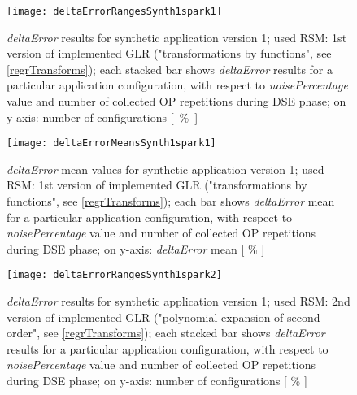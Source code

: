 \begin{figure}[H]

    \centering
    
    \texttt{[image: deltaErrorRangesSynth1spark1]}
    
     \caption{\textit{deltaError} results for synthetic application version 1; used RSM: 1st version of implemented GLR ("transformations by functions", see \ref{regrTransforms}); each stacked bar shows \textit{deltaError} results for a particular application configuration, with respect to \textit{noisePercentage} value and number of collected OP repetitions during DSE phase; on y-axis: number of configurations \hbox{[ \% ]}}
    
    \label{fig::synth1spark1::intervals}
    
\end{figure}

\begin{figure}[H]

    \centering
    
    \texttt{[image: deltaErrorMeansSynth1spark1]}
    
    \caption{\textit{deltaError} mean values for synthetic application version 1; used RSM: 1st version of implemented GLR ("transformations by functions", see \ref{regrTransforms}); each bar shows \textit{deltaError} mean for a particular application configuration, with respect to \textit{noisePercentage} value and number of collected OP repetitions during DSE phase; on y-axis: \textit{deltaError} mean [ \% ]}
    
    \label{fig::synth1spark1::means}
    
\end{figure}





\begin{figure}[H]

    \centering
    
    \texttt{[image: deltaErrorRangesSynth1spark2]}
    
     \caption{\textit{deltaError} results for synthetic application version 1; used RSM: 2nd version of implemented GLR ("polynomial expansion of second order", see \ref{regrTransforms}); each stacked bar shows \textit{deltaError} results for a particular application configuration, with respect to \textit{noisePercentage} value and number of collected OP repetitions during DSE phase; on y-axis: number of configurations [ \% ]}
    
    \label{fig::synth1spark2::intervals}
    
\end{figure}

